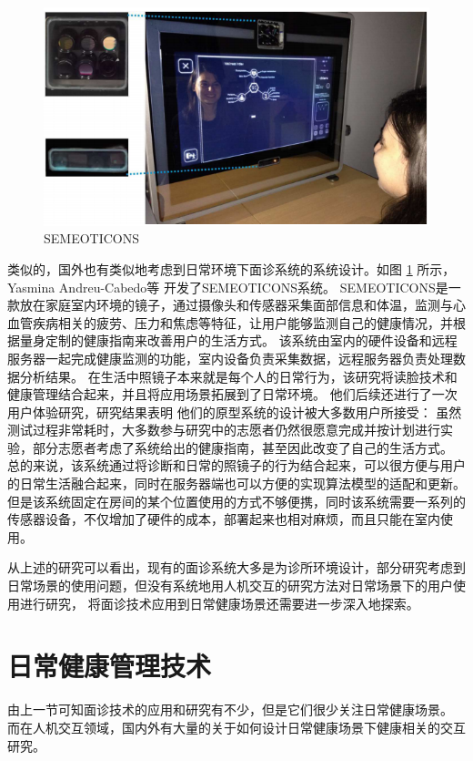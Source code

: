 \begin{figure}[h]
    \centering
    \includegraphics[width=12cm]{images/mirror.png}
    \caption{SEMEOTICONS\cite{andreu2015mirror}}
    \label{fig:seme}
\end{figure}
类似的，国外也有类似地考虑到日常环境下面诊系统的系统设计。如图 \ref{fig:seme} 所示，Yasmina Andreu-Cabedo等 \cite{andreu2015mirror}开发了SEMEOTICONS系统。
SEMEOTICONS是一款放在家庭室内环境的镜子，通过摄像头和传感器采集面部信息和体温，监测与心血管疾病相关的疲劳、压力和焦虑等特征，让用户能够监测自己的健康情况，并根据量身定制的健康指南来改善用户的生活方式。
该系统由室内的硬件设备和远程服务器一起完成健康监测的功能，室内设备负责采集数据，远程服务器负责处理数据分析结果。
在生活中照镜子本来就是每个人的日常行为，该研究将读脸技术和健康管理结合起来，并且将应用场景拓展到了日常环境。
他们后续还进行了一次用户体验研究，研究结果表明\cite{coppini2017user} 他们的原型系统的设计被大多数用户所接受： 虽然测试过程非常耗时，大多数参与研究中的志愿者仍然很愿意完成并按计划进行实验，部分志愿者考虑了系统给出的健康指南，甚至因此改变了自己的生活方式。
总的来说，该系统通过将诊断和日常的照镜子的行为结合起来，可以很方便与用户的日常生活融合起来，同时在服务器端也可以方便的实现算法模型的适配和更新。
但是该系统固定在房间的某个位置使用的方式不够便携，同时该系统需要一系列的传感器设备，不仅增加了硬件的成本，部署起来也相对麻烦，而且只能在室内使用。

从上述的研究可以看出，现有的面诊系统大多是为诊所环境设计，部分研究考虑到日常场景的使用问题，但没有系统地用人机交互的研究方法对日常场景下的用户使用进行研究，
将面诊技术应用到日常健康场景还需要进一步深入地探索。

\section{日常健康管理技术}

由上一节可知面诊技术的应用和研究有不少，但是它们很少关注日常健康场景。
而在人机交互领域，国内外有大量的关于如何设计日常健康场景下健康相关的交互研究。

